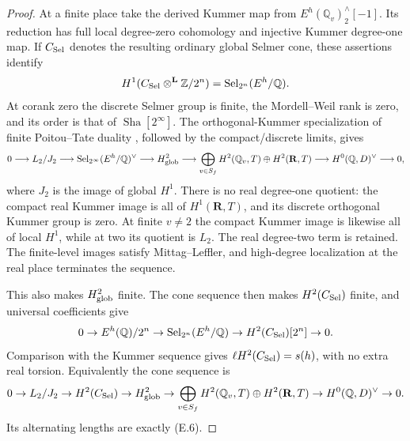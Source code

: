 \documentclass[11pt]{article}
\theoremstyle{definition}
\theoremstyle{remark}
\newcommand{\Q}{\mathbb Q}
\newcommand{\Z}{\mathbb Z}
\newcommand{\Sha}{\operatorname{Sha}}
\begin{document}
\begin{proof}
At a finite place take the derived Kummer map from
$E^h(\Q_v)^\wedge_2[-1]$. Its reduction has full local degree-zero
cohomology and injective Kummer degree-one map. If $C_{\rm Sel}$
denotes the resulting ordinary global Selmer cone, these assertions
identify
\[
 H^1(C_{\rm Sel}\otimes^{\mathbf L}\Z/2^n)
       =\operatorname{Sel}_{2^n}(E^h/\Q).
\]
At corank zero the discrete Selmer group is finite, the Mordell--Weil
rank is zero, and its order is that of $\Sha[2^\infty]$. The
orthogonal-Kummer specialization of finite Poitou--Tate duality
\cite[5.7.1.4--5.7.1.7]{nekovar}, followed by the compact/discrete
limits, gives
\[
\begin{split}
0\longrightarrow L_2/J_2
 \longrightarrow\operatorname{Sel}_{2^\infty}(E^h/\Q)^\vee
 \longrightarrow H^2_{\rm glob}
 \longrightarrow \bigoplus_{v\in S_f}H^2(\Q_v,T)\oplus H^2(\mathbf R,T)
 \longrightarrow H^0(\Q,D)^\vee\longrightarrow0 ,
\end{split}
\]
where $J_2$ is the image of global $H^1$. There is no real
degree-one quotient: the compact real Kummer image is all of
$H^1(\mathbf R,T)$, and its discrete orthogonal Kummer group is zero.
At finite $v\ne2$ the compact Kummer image is likewise all of local
$H^1$, while at two its quotient is $L_2$. The real degree-two term
is retained. The finite-level images satisfy Mittag--Leffler, and
high-degree localization at the real place terminates the sequence.

This also makes $H^2_{\rm glob}$ finite. The cone sequence then
makes $H^2(C_{\rm Sel})$ finite, and universal coefficients give
\[
 0\to E^h(\Q)/2^n
 \to\operatorname{Sel}_{2^n}(E^h/\Q)
 \to H^2(C_{\rm Sel})[2^n]\to0.
\]
Comparison with the Kummer sequence gives
$\ell H^2(C_{\rm Sel})=s(h)$, with no extra real torsion. Equivalently
the cone sequence is
\[
0\to L_2/J_2\to H^2(C_{\rm Sel})\to H^2_{\rm glob}
 \to \bigoplus_{v\in S_f}H^2(\Q_v,T)\oplus H^2(\mathbf R,T)
 \to H^0(\Q,D)^\vee\to0.
\]
Its alternating lengths are exactly (E.6).


\end{proof}
\end{document}
